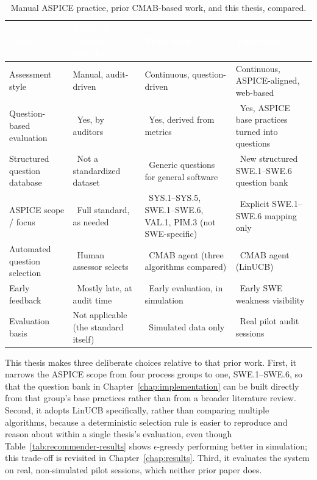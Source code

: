 \documentclass[a4paper, 12pt, oneside, openany, BCOR1cm,toc=chapterentrywithdots]{scrbook}
\newcommand{\cmark}{\textcolor{green!45!black}{\ding{51}}}
\newcommand{\xmark}{\textcolor{red!60!black}{\ding{55}}}
\begin{document}
\begin{table}[h]
\centering
\caption{Manual ASPICE practice, prior CMAB-based work, and this thesis, compared.}
\label{tab:cross-comparison}
\begin{tabular}{|p{2.7cm}|p{3.0cm}|p{3.6cm}|p{3.6cm}|}
\hline
\rowcolor{green!55!black}
\textcolor{white}{\textbf{Aspect}} & \textcolor{white}{\textbf{ASPICE (current practice)}} &
\textcolor{white}{\textbf{Prior work~\cite{datsogiannis2024early,datsogiannis2025recommender}}} &
\textcolor{white}{\textbf{This thesis}} \\
\hline
Assessment style & Manual, audit-driven & Continuous, question-driven & Continuous,
ASPICE-aligned, web-based \\
\hline
Question-based evaluation & \cmark\ Yes, by auditors & \cmark\ Yes, derived from metrics &
\cmark\ Yes, ASPICE base practices turned into questions \\
\hline
Structured question database & \xmark\ Not a standardized dataset & \cmark\ Generic questions for
general software & \cmark\ New structured SWE.1--SWE.6 question bank \\
\hline
ASPICE scope / focus & \cmark\ Full standard, as needed & \xmark\ SYS.1--SYS.5, SWE.1--SWE.6,
VAL.1, PIM.3 (not SWE-specific) & \cmark\ Explicit SWE.1--SWE.6 mapping only \\
\hline
Automated question selection & \xmark\ Human assessor selects & \cmark\ CMAB agent (three
algorithms compared) & \cmark\ CMAB agent (LinUCB) \\
\hline
Early feedback & \xmark\ Mostly late, at audit time & \cmark\ Early evaluation, in simulation &
\cmark\ Early SWE weakness visibility \\
\hline
Evaluation basis & Not applicable (the standard itself) & \xmark\ Simulated data only & \cmark\
Real pilot audit sessions \\
\hline
\end{tabular}
\end{table}

This thesis makes three deliberate choices relative to that prior work. First, it narrows the
ASPICE scope from four process groups to one, SWE.1--SWE.6, so that the question bank in
Chapter~\ref{chap:implementation} can be built directly from that group's base practices rather
than from a broader literature review. Second, it adopts LinUCB specifically, rather than
comparing multiple algorithms, because a deterministic selection rule is easier to reproduce and
reason about within a single thesis's evaluation, even though Table~\ref{tab:recommender-results}
shows $\epsilon$-greedy performing better in simulation; this trade-off is revisited in
Chapter~\ref{chap:results}. Third, it evaluates the system on real, non-simulated pilot sessions,
which neither prior paper does.
\end{document}
